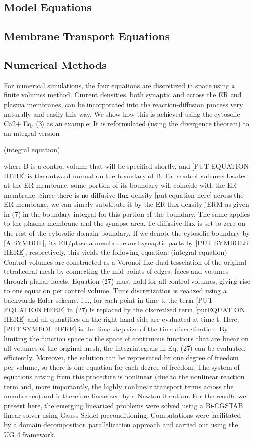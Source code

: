 \documentclass[fleqn,12pt]{wlscirep}
\begin{document}
\subsection*{Model Equations}
\subsection*{Membrane Transport Equations}

\subsection*{Numerical Methods}
For numerical simulations, the four equations are discretized in space using a finite volumes method. Current densities, both synaptic and across the ER and plasma membranes, can be incorporated into the reaction-diffusion process very naturally and easily this way. We show how this is achieved using the cytosolic Ca2+ Eq. (3) as an example: It is reformulated (using the divergence theorem) to an integral version 

(integral equation)

where B is a control volume that will be specified shortly, and [PUT EQUATION HERE] is the outward normal on the boundary of B. For control volumes located at the ER membrane, some portion of its boundary will coincide with the ER membrane. Since there is no diffusive flux density [put equation here] across the ER membrane, we can simply substitute it by the ER flux density jERM as given in (7) in the boundary integral for this portion of the boundary. The same applies to the plasma membrane and the synapse area. Te diffusive flux is set to zero on the rest of the cytosolic domain
boundary. If we denote the cytosolic boundary by [A SYMBOL], its ER/plasma membrane and synaptic parts by [PUT SYMBOLS HERE], respectively, this yields the following equation:
(integral equation)
Control volumes are constructed as a Voronoi-like dual tesselation of the original tetrahedral mesh by connecting the mid-points of edges, faces and volumes through planar facets. Equation (27) must hold for all control volumes, giving rise to one equation per control volume.
Time discretization is realized using a backwards Euler scheme, i.e., for each point in time t, the term [PUT EQUATION HERE] in (27) is replaced by the discretized term [putEQUATION HERE] and all quantities on the right-hand side are evaluated at time t. Here, [PUT SYMBOL HERE] is the time step size of the time discretization. By limiting the function space to the space of continuous functions that are linear on all volumes of the original mesh, the integrintegrals in Eq. (27) can be evaluated efficiently. Moreover, the solution can be represented by one degree of freedom per volume, so there is one equation for each degree of freedom. The system of equations arising from this procedure is nonlinear (due to the nonlinear reaction term and, more importantly, the highly nonlinear transport terms across the membranes) and is therefore linearized by a Newton iteration.
For the results we present here, the emerging linearized problems were solved using a Bi-CGSTAB linear solver using Gauss-Seidel preconditioning. Computations were facilitated by a domain decomposition parallelization approach and carried out using the UG 4 framework.
\end{document}
